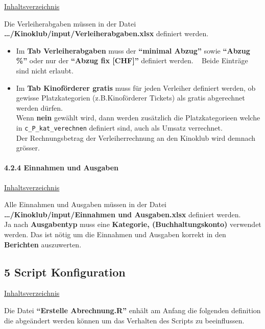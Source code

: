 \documentclass[
]{article}
\begin{document}
\hyperref[Inhaltsverzeichnis]{Inhaltsverzeichnis}

Die Verleiherabgaben müssen in der Datei
\textbf{\ldots/Kinoklub/input/Verleiherabgaben.xlsx} definiert werden.\\

\begin{itemize}
\item
  Im \textbf{Tab Verleiherabgaben} muss der \textbf{``minimal Abzug''}
  sowie \textbf{``Abzug \%''} oder nur der \textbf{``Abzug fix
  {[}CHF{]}''} definiert werden. ~ Beide Einträge sind nicht erlaubt.
\item
  Im \textbf{Tab Kinoförderer gratis} muss für jeden Verleiher definiert
  werden, ob gewisse Platzkategorien (z.B.Kinoförderer Tickets) als
  gratis abgerechnet werden dürfen.\\
  Wenn \textbf{nein} gewählt wird, dann werden zusätzlich die
  Platzkategorieen welche in \texttt{c\_P\_kat\_verechnen} definiert
  sind, auch als Umsatz verrechnet.\\
  Der Rechnungsbetrag der Verleiherrechnung an den Kinoklub wird demnach
  grösser.
\end{itemize}

\paragraph{4.2.4 Einnahmen und Ausgaben}\label{einnahmen-und-ausgaben}

\hyperref[Inhaltsverzeichnis]{Inhaltsverzeichnis}

Alle Einnahmen und Ausgaben müssen in der Datei
\textbf{\ldots/Kinoklub/input/Einnahmen und Ausgaben.xlsx} definiert
werden.\\
Ja nach \textbf{Ausgabentyp} muss eine \textbf{Kategorie,
(Buchhaltungskonto)} verwendet werden. Das ist nötig um die Einnahmen
und Ausgaben korrekt in den \textbf{Berichten} auszuwerten.

\newpage

\subsection{5 Script Konfiguration}\label{script-konfiguration}

\hyperref[Inhaltsverzeichnis]{Inhaltsverzeichnis}

Die Datei \textbf{``Erstelle Abrechnung.R''} enhält am Anfang die
folgenden definition die abgeändert werden können um das Verhalten des
Scripts zu beeinflussen.
\end{document}
